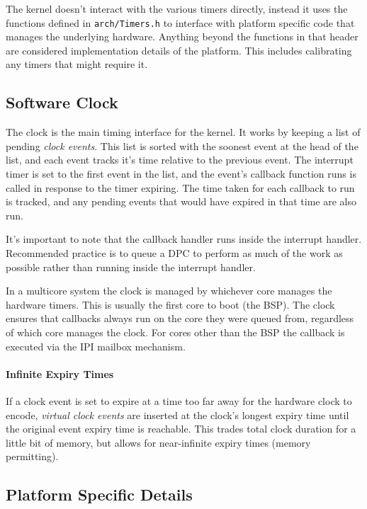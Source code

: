 The kernel doesn't interact with the various timers directly, instead it uses the functions defined in \verb|arch/Timers.h| to interface with platform specific code that manages the underlying hardware. Anything beyond the functions in that header are considered implementation details of the platform. This includes calibrating any timers that might require it.

\subsection{Software Clock}
The clock is the main timing interface for the kernel. It works by keeping a list of pending \textit{clock events}. This list is sorted with the soonest event at the head of the list, and each event tracks it's time relative to the previous event. The interrupt timer is set to the first event in the list, and the event's callback function runs is called in response to the timer expiring. The time taken for each callback to run is tracked, and any pending events that would have expired in that time are also run.

It's important to note that the callback handler runs inside the interrupt handler. Recommended practice is to queue a DPC to perform as much of the work as possible rather than running inside the interrupt handler.

In a multicore system the clock is managed by whichever core manages the hardware timers. This is usually the first core to boot (the BSP). The clock ensures that callbacks always run on the core they were queued from, regardless of which core manages the clock. For cores other than the BSP the callback is executed via the IPI mailbox mechanism.

\paragraph{Infinite Expiry Times}
If a clock event is set to expire at a time too far away for the hardware clock to encode, \textit{virtual clock events} are inserted at the clock's longest expiry time until the original event expiry time is reachable. This trades total clock duration for a little bit of memory, but allows for near-infinite expiry times (memory permitting).

\subsection{Platform Specific Details}

